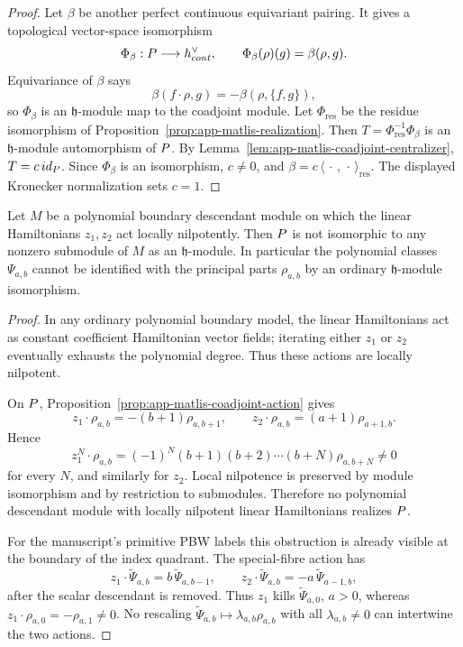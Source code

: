 \begin{proof}
  Let \(\beta\) be another perfect continuous equivariant pairing.  It
  gives a topological vector-space isomorphism
  \[
    \Phi_\beta:P\longrightarrow h^\vee_{cont},
    \qquad
    \Phi_\beta(\rho)(g)=\beta(\rho,g).
  \]
  Equivariance of \(\beta\) says
  \[
    \beta(f\cdot\rho,g)=-\beta(\rho,\{f,g\}),
  \]
  so \(\Phi_\beta\) is an \(\mathfrak h\)-module map to the coadjoint
  module.  Let \(\Phi_{\mathrm{res}}\) be the residue isomorphism of
  Proposition~\ref{prop:app-matlis-realization}.  Then
  \(T=\Phi_{\mathrm{res}}^{-1}\Phi_\beta\) is an \(\mathfrak h\)-module
  automorphism of \(P\).  By
  Lemma~\ref{lem:app-matlis-coadjoint-centralizer},
  \(T=c\,id_{P}\).  Since \(\Phi_\beta\) is an isomorphism,
  \(c\neq0\), and
  \(\beta=c\,\langle\,\cdot\,,\,\cdot\,\rangle_{\mathrm{res}}\).  The
  displayed Kronecker normalization sets \(c=1\).
\end{proof}

\begin{thm}
\label{thm:app-matlis-polynomial-descendant-obstruction}
  Let \(M\) be a polynomial boundary descendant module on which the
  linear Hamiltonians \(z_1,z_2\) act locally nilpotently.  Then
  \(P\) is not isomorphic to any nonzero submodule of \(M\) as an
  \(\mathfrak h\)-module.  In particular the polynomial classes
  \(\Psi_{a,b}\) cannot be identified with the principal parts
  \(\rho_{a,b}\) by an ordinary \(\mathfrak h\)-module isomorphism.
\end{thm}

\begin{proof}
  In any ordinary polynomial boundary model, the linear Hamiltonians
  act as constant coefficient Hamiltonian vector fields; iterating
  either \(z_1\) or \(z_2\) eventually exhausts the polynomial degree.
  Thus these actions are locally nilpotent.

  On \(P\), Proposition~\ref{prop:app-matlis-coadjoint-action}
  gives
  \[
    z_1\cdot\rho_{a,b}=-(b+1)\rho_{a,b+1},\qquad
    z_2\cdot\rho_{a,b}=(a+1)\rho_{a+1,b}.
  \]
  Hence
  \[
    z_1^N\cdot\rho_{a,b}
      =(-1)^N(b+1)(b+2)\cdots(b+N)\rho_{a,b+N}\neq0
  \]
  for every \(N\), and similarly for \(z_2\).  Local nilpotence is
  preserved by module isomorphism and by restriction to submodules.
  Therefore no polynomial descendant module with locally nilpotent
  linear Hamiltonians realizes \(P\).

  For the manuscript's primitive PBW labels this obstruction is already
  visible at the boundary of the index quadrant.  The special-fibre action
  has
  \[
    z_1\cdot\widetilde\Psi_{a,b}=b\,\widetilde\Psi_{a,b-1},
    \qquad
    z_2\cdot\widetilde\Psi_{a,b}=-a\,\widetilde\Psi_{a-1,b},
  \]
  after the scalar descendant is removed.  Thus \(z_1\) kills
  \(\widetilde\Psi_{a,0}\), \(a>0\), whereas
  \(z_1\cdot\rho_{a,0}=-\rho_{a,1}\neq0\).  No rescaling
  \(\widetilde\Psi_{a,b}\mapsto\lambda_{a,b}\rho_{a,b}\) with all
  \(\lambda_{a,b}\neq0\) can intertwine the two actions.
\end{proof}

